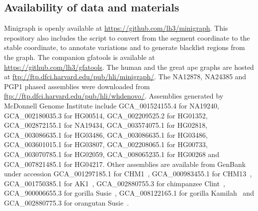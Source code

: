 \documentclass[twocolumn]{bmcart}
\begin{document}
\begin{backmatter}
\section*{Availability of data and materials}
Minigraph is openly available at
\href{https://github.com/lh3/minigraph}{https://github.com/lh3/minigraph}.
This repository also includes the script to convert from the segment coordinate
to the stable coordinate, to annotate variations and to generate blacklist
regions from the graph. The companion gfatools is available at
\href{https://github.com/lh3/gfatols}{https://github.com/lh3/gfatools}. The
human and the great ape graphs are hosted at
\href{ftp://ftp.dfci.harvard.edu/pub/hli/minigraph/}{ftp://ftp.dfci.harvard.edu/pub/hli/minigraph/}.
The NA12878, NA24385 and PGP1 phased assemblies were downloaded from
\href{ftp://ftp.dfci.harvard.edu/pub/hli/whdenovo/}{ftp://ftp.dfci.harvard.edu/pub/hli/whdenovo/}.
Assemblies generated by McDonnell Genome Institute include 
GCA\_001524155.4 for NA19240, GCA\_002180035.3 for HG00514, GCA\_002209525.2
for HG01352, GCA\_002872155.1 for NA19434, GCA\_003574075.1 for HG02818,
GCA\_003086635.1 for HG03486, GCA\_003086635.1 for HG03486, GCA\_003601015.1
for HG03807, GCA\_002208065.1 for HG00733, GCA\_003070785.1 for HG02059,
GCA\_008065235.1 for HG00268 and GCA\_007821485.1 for HG04217. Other assemblies
are available from GenBank under accession GCA\_001297185.1 for
CHM1~\cite{Huddleston:2017aa}, GCA\_000983455.1 for
CHM13~\cite{Huddleston:2017aa}, GCA\_001750385.1 for AK1~\cite{Seo:2016aa},
GCA\_002880755.3 for chimpanzee Clint~\cite{Kronenberg:2018aa},
GCA\_900006655.3 for gorilla Susie~\cite{Gordon:2016kq}, GCA\_008122165.1 for
gorilla Kamilah~\cite{Kronenberg:2018aa} and GCA\_002880775.3 for orangutan
Susie~\cite{Kronenberg:2018aa}.









\end{backmatter}
\end{document}
